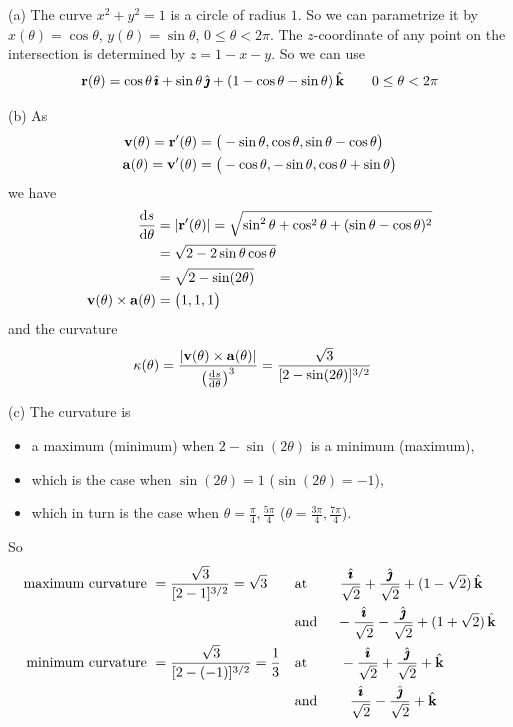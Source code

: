 \begin{solution} (a)
The curve $x^2+y^2=1$ is a circle of radius $1$.
So we can parametrize it by $x(\theta)=\cos\theta$, 
$y(\theta)=\sin\theta$, $0\le\theta<2\pi$. The $z$-coordinate of any point on
the intersection is determined by $z=1-x-y$. So we can use
\begin{equation*}
\mathbf{r}(\theta) = \cos\theta\,\hat{\pmb{\imath}} +\sin\theta\,\hat{\pmb{\jmath}} + (1-\cos\theta-\sin\theta)\,\hat{\mathbf{k}}
\qquad 0\le\theta<2\pi
\end{equation*}

(b) 
As
\begin{align*}
\mathbf{v}(\theta)=\mathbf{r}'(\theta)&=\big(-\sin\theta,\cos\theta,\sin\theta-\cos\theta\big) \\
\mathbf{a}(\theta)=\mathbf{v}'(\theta)&=\big(-\cos\theta,-\sin\theta,\cos\theta+\sin\theta\big)
\end{align*}
we have
\begin{align*}
\diff{s}{\theta} &= |\vr'(\theta)|
=\sqrt{\sin^2\theta+\cos^2\theta+(\sin\theta-\cos\theta)^2}\\
&=\sqrt{2-2\sin\theta\cos\theta} \\
&=\sqrt{2-\sin(2\theta)} \\
\vv(\theta)\times\va(\theta)&=\big(1,1,1\big)
\end{align*}
and the curvature
\begin{align*}
\ka(\theta) &= \frac{|\vv(\theta)\times\va(\theta)|}{\big(\diff{s}{\theta}\big)^3}
 =\frac{\sqrt{3}}{[2-\sin(2\theta)]^{3/2}}
\end{align*}

(c) The curvature is 
\begin{itemize}\itemsep1pt \parskip0pt  %
\item[$\circ$] 
a maximum (minimum) when $2-\sin(2\theta)$
is a minimum (maximum), 
\item[$\circ$]
which is the case when $\sin(2\theta)=1$
($\sin(2\theta)=-1$), 
\item[$\circ$]
which in turn is the case when $\theta=\frac{\pi}{4},\frac{5\pi}{4}$
($\theta=\frac{3\pi}{4},\frac{7\pi}{4}$). 
\end{itemize}
So
\begin{align*}
\text{maximum curvature }&= \frac{\sqrt{3}}{[2-1]^{3/2}}=\sqrt{3} &&
\text{at }\qquad\frac{\hat{\pmb{\imath}}}{\sqrt{2}}+\frac{\hat{\pmb{\jmath}}}{\sqrt{2}}+(1-\sqrt{2})\,\hat{\mathbf{k}} \\
& &&
\text{and }\quad-\frac{\hat{\pmb{\imath}}}{\sqrt{2}}-\frac{\hat{\pmb{\jmath}}}{\sqrt{2}}+(1+\sqrt{2})\,\hat{\mathbf{k}} \\
\text{minimum curvature }&= \frac{\sqrt{3}}{[2-(-1)]^{3/2}}=\frac{1}{3} &&
\text{at }\qquad-\frac{\hat{\pmb{\imath}}}{\sqrt{2}}+\frac{\hat{\pmb{\jmath}}}{\sqrt{2}}+\hat{\mathbf{k}} \\
& &&
\text{and }\qquad\frac{\hat{\pmb{\imath}}}{\sqrt{2}}-\frac{\hat{\pmb{\jmath}}}{\sqrt{2}}+\hat{\mathbf{k}} 
\end{align*}

\end{solution}


